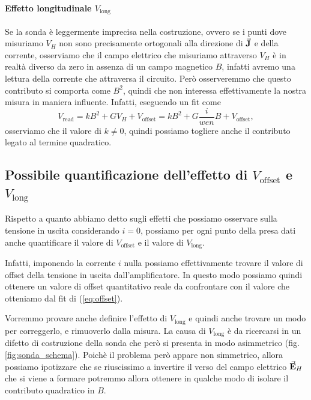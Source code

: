 \documentclass[fleqn,varvw,preprintnumbers,citeautoscript]{memo}
\newcommand\vlong{V_\text{long}}
\begin{document}
\paragraph{Effetto longitudinale $V_\text{long}$} Se la sonda è leggermente imprecisa nella costruzione, ovvero se i punti dove misuriamo $V_H$ non sono precisamente ortogonali alla direzione di $\va{J}$ e della corrente, osserviamo che il campo elettrico che misuriamo attraverso $V_H$ è in realtà diverso da zero in assenza di un campo magnetico $B$, infatti avremo una lettura della corrente che attraversa il circuito. Però osserveremmo che questo contributo si comporta come $B^2$, quindi che non interessa effettivamente la nostra misura in maniera influente. Infatti, eseguendo un fit come \begin{equation}
    V_\text{read} = kB^2 +  GV_H + V_\text{offset} = kB^2 + G\frac{i}{wen}B + V_\text{offset},\label{eq:B2_dep}
\end{equation} osserviamo che il valore di $k\neq0$, quindi possiamo togliere anche il contributo legato al termine quadratico. 

\subsection{Possibile quantificazione dell'effetto di $V_\text{offset}$ e $V_\text{long}$}

 Rispetto a quanto abbiamo detto sugli effetti che possiamo osservare sulla tensione in uscita considerando $i=0$, possiamo per ogni punto della presa dati anche quantificare il valore di $V_\text{offset}$ e il valore di $V_\text{long}$. 

Infatti, imponendo la corrente $i$ nulla possiamo effettivamente trovare il valore di offset della tensione in uscita dall'amplificatore. In questo modo possiamo quindi ottenere un valore di offset quantitativo reale da confrontare con il valore che otteniamo dal fit di (\ref{eq:offset}). 

Vorremmo provare anche definire l'effetto di $\vlong$ e quindi anche trovare un modo per correggerlo, e rimuoverlo dalla misura. La causa di $\vlong$ è da ricercarsi in un difetto di costruzione della sonda che però si presenta in modo asimmetrico (fig. \ref{fig:sonda_schema}). Poichè il problema però appare non simmetrico, allora possiamo ipotizzare che se riuscissimo a invertire il verso del campo elettrico $\va{E}_H$ che si viene a formare potremmo allora ottenere in qualche modo di isolare il contributo quadratico in $B$. 
\end{document}
